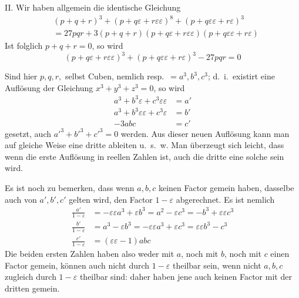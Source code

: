 II. Wir haben allgemein die identische Gleichung
\[
\begin{aligned}
&(p+q+r)^3+(p+q\varepsilon+r\varepsilon\varepsilon)^8+(p+q\varepsilon\varepsilon+r\varepsilon)^3\\
&=27pqr+3(p+q+r)(p+q\varepsilon+r\varepsilon\varepsilon)(p+q\varepsilon\varepsilon+r\varepsilon)
\end{aligned}
\]
Ist folglich $p+q+r=0$, so wird
\[
(p+q\varepsilon+r\varepsilon\varepsilon)^3+(p+q\varepsilon\varepsilon+r\varepsilon)^3-27pqr=0
\]

Sind hier $p,q,r,$ selbst Cuben, nemlich resp.\ $=a^3,b^3,c^3$; d.\ i.\ existirt eine Auflösung der Gleichung $x^3+y^3+z^3=0$, so wird
\[
\begin{aligned}
a^3+b^3\varepsilon+c^3\varepsilon\varepsilon&=a'\\
a^3+b^3\varepsilon\varepsilon+c^3\varepsilon&=b'\\
-3abc&=c'
\end{aligned}
\]
gesetzt, auch $a'^3+b'^3+c'^3=0$ werden. Aus dieser neuen Auflösung kann man auf gleiche Weise eine dritte ableiten u.\ s.\ w. Man überzeugt sich leicht, dass wenn die erste Auflösung in reellen Zahlen ist, auch die dritte eine solche sein wird.

Es ist noch zu bemerken, dass wenn $a,b,c$ keinen Factor gemein haben, dasselbe auch von $a',b',c'$ gelten wird, den Factor $1-\varepsilon$ abgerechnet. Es ist nemlich
\[
\begin{aligned}
\frac{a'}{1-\varepsilon}&=-\varepsilon\varepsilon a^3+\varepsilon b^3=a^2-\varepsilon c^3=-b^3+\varepsilon\varepsilon c^3\\
\frac{b'}{1-\varepsilon}&=a^3-\varepsilon b^3=-\varepsilon\varepsilon a^3+\varepsilon c^3=\varepsilon\varepsilon b^3-c^3\\
\frac{c'}{1-\varepsilon}&=(\varepsilon\varepsilon-1)abc
\end{aligned}
\]
Die beiden ersten Zahlen haben also weder mit $a$, noch mit $b$, noch mit $c$ einen Factor gemein, können auch nicht durch $1-\varepsilon$ theilbar sein, wenn nicht $a,b,c$
%
zugleich durch $1-\varepsilon$ theilbar sind: daher haben jene auch keinen Factor mit der dritten gemein.

